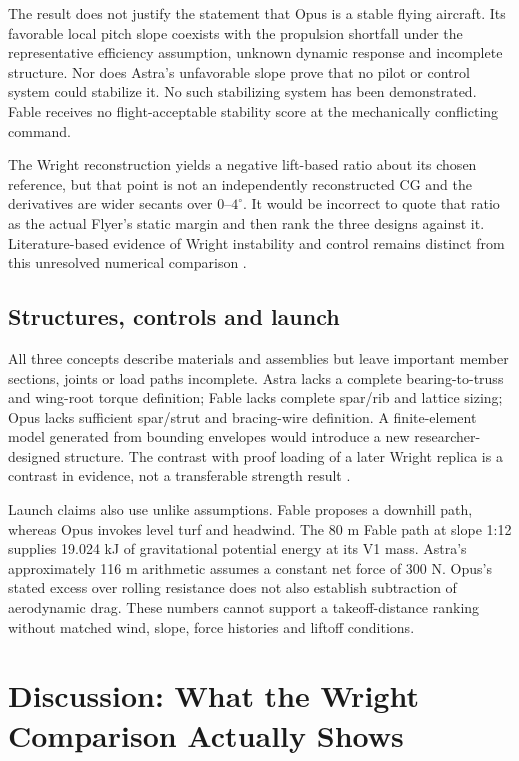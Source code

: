 \documentclass[11pt,a4paper]{article}
\begin{document}
The result does not justify the statement that Opus is a stable flying aircraft. Its favorable local pitch slope coexists with the propulsion shortfall under the representative efficiency assumption, unknown dynamic response and incomplete structure. Nor does Astra's unfavorable slope prove that no pilot or control system could stabilize it. No such stabilizing system has been demonstrated. Fable receives no flight-acceptable stability score at the mechanically conflicting command.

The Wright reconstruction yields a negative lift-based ratio about its chosen reference, but that point is not an independently reconstructed CG and the derivatives are wider secants over $0$--$4^\circ$. It would be incorrect to quote that ratio as the actual Flyer's static margin and then rank the three designs against it. Literature-based evidence of Wright instability and control remains distinct from this unresolved numerical comparison \cite{ref6,ref10}.

\subsection{Structures, controls and launch}
All three concepts describe materials and assemblies but leave important member sections, joints or load paths incomplete. Astra lacks a complete bearing-to-truss and wing-root torque definition; Fable lacks complete spar/rib and lattice sizing; Opus lacks sufficient spar/strut and bracing-wire definition. A finite-element model generated from bounding envelopes would introduce a new researcher-designed structure. The contrast with proof loading of a later Wright replica is a contrast in evidence, not a transferable strength result \cite{ref14}.

Launch claims also use unlike assumptions. Fable proposes a downhill path, whereas Opus invokes level turf and headwind. The 80 m Fable path at slope 1:12 supplies 19.024 kJ of gravitational potential energy at its V1 mass. Astra's approximately 116 m arithmetic assumes a constant net force of 300 N. Opus's stated excess over rolling resistance does not also establish subtraction of aerodynamic drag. These numbers cannot support a takeoff-distance ranking without matched wind, slope, force histories and liftoff conditions.

\section{Discussion: What the Wright Comparison Actually Shows}
\end{document}
